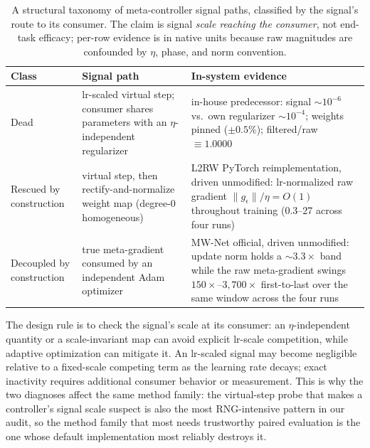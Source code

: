 \documentclass[10pt,letterpaper]{article}
\theoremstyle{remark}
\begin{document}
\begin{table}[tbp]
\centering
\small
\begin{tabular}{@{}p{}p{}p{}@{}}
\toprule
Class & Signal path & In-system evidence \\
\midrule
Dead &
lr-scaled virtual step; consumer shares parameters with an
$\eta$-independent regularizer &
in-house predecessor: signal ${\sim}10^{-6}$ vs.\ own regularizer
${\sim}10^{-4}$; weights pinned ($\pm 0.5\%$); filtered/raw
$\equiv 1.0000$ \\
\addlinespace
Rescued by construction &
virtual step, then rectify-and-normalize weight map (degree-0 homogeneous) &
L2RW PyTorch reimplementation, driven unmodified: lr-normalized raw gradient
$\lVert g_\epsilon \rVert / \eta = O(1)$ throughout training (0.3--27
across four runs) \\
\addlinespace
Decoupled by construction &
true meta-gradient consumed by an independent Adam optimizer &
MW-Net official, driven unmodified: update norm holds a ${\sim}3.3\times$
band while the raw meta-gradient swings $150\times$--$3{,}700\times$
first-to-last over the same window across the four runs \\
\bottomrule
\end{tabular}
\caption{A structural taxonomy of meta-controller signal paths, classified by
the signal's route to its consumer. The claim is signal \emph{scale reaching
the consumer}, not end-task efficacy; per-row evidence is in native units
because raw magnitudes are confounded by $\eta$, phase, and norm convention.}
\label{tab:f1}
\end{table}

The design rule is to check the signal's scale at its consumer: an
$\eta$-independent quantity or a scale-invariant map can avoid explicit
lr-scale competition, while adaptive optimization can mitigate it. An
lr-scaled signal may become negligible relative to a fixed-scale competing
term as the learning rate decays; exact inactivity requires additional
consumer behavior or measurement. This is why the two diagnoses affect the
same method family: the virtual-step probe that makes a controller's signal scale
suspect is also the most RNG-intensive pattern in our audit, so the method family
that most needs trustworthy paired evaluation is the one whose default
implementation most reliably destroys it.
\end{document}
